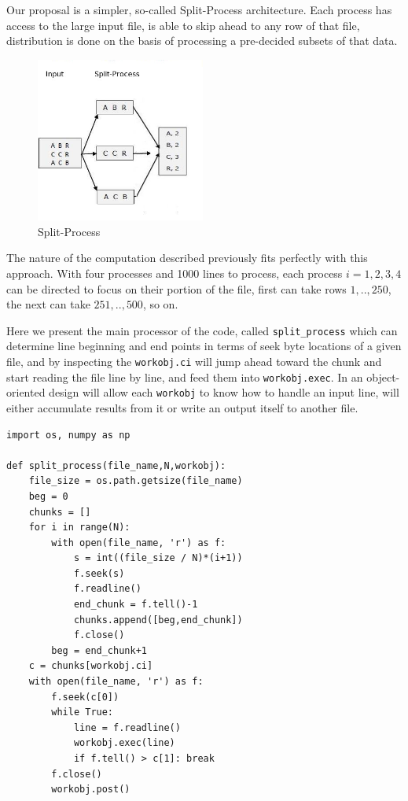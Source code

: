 \documentclass{article}
\begin{document}
Our proposal is a simpler, so-called Split-Process architecture. Each process
has access to the large input file, is able to skip ahead to any row of that
file, distribution is done on the basis of processing a pre-decided subsets of
that data.

\begin{figure}[h]
  \centering
  \includegraphics[width=15em]{splitprocess.jpg}
  \caption{Split-Process}
  \label{fig:mapreduce1}
\end{figure}

The nature of the computation described previously fits perfectly with this
approach. With four processes and 1000 lines to process, each process
$i=1,2,3,4$ can be directed to focus on their portion of the file, first can
take rows $1,..,250$, the next can take $251,..,500$, so on.

Here we present the main processor of the code, called \verb!split_process!
which can determine line beginning and end points in terms of seek byte
locations of a given file, and by inspecting the \verb!workobj.ci! will
jump ahead toward the chunk and start reading the file line by line, and
feed them into \verb!workobj.exec!. In an object-oriented design will allow each
\verb!workobj! to know how to handle an input line, will either accumulate
results from it or write an output itself to another file.

\begin{verbatim}
import os, numpy as np

def split_process(file_name,N,workobj):
    file_size = os.path.getsize(file_name)
    beg = 0
    chunks = []
    for i in range(N):
        with open(file_name, 'r') as f:
            s = int((file_size / N)*(i+1))
            f.seek(s)
            f.readline()
            end_chunk = f.tell()-1
            chunks.append([beg,end_chunk])
            f.close()
        beg = end_chunk+1
    c = chunks[workobj.ci]
    with open(file_name, 'r') as f:
        f.seek(c[0])
        while True:
            line = f.readline()
            workobj.exec(line)
            if f.tell() > c[1]: break
        f.close()
        workobj.post()
\end{verbatim}
\end{document}
